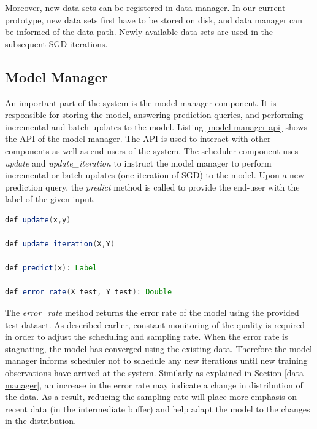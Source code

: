 Moreover,  new data sets can be registered in data manager.
In our current prototype, new data sets first have to be stored on disk, and data manager can be informed of the data path.
Newly available data sets are used in the subsequent SGD iterations.

\subsection{Model Manager} \label{model-manager} 
An important part of the system is the model manager component.
It is responsible for storing the model, answering prediction queries, and performing incremental and batch updates to the model.
Listing \ref{model-manager-api} shows the API of the model manager.
The API is used to interact with other components as well as end-users of the system.
The scheduler component uses \textit{update} and \textit{update\_iteration} to instruct the model manager to perform incremental or batch updates (one iteration of SGD) to the model.
Upon a new prediction query, the \textit{predict} method is called to provide the end-user with the label of the given input.

\noindent\begin{minipage}[t]{\linewidth}
\begin{lstlisting}[language=java, basicstyle=\small\ttfamily, frame=tb ,columns=fullflexible,
showstringspaces=false,label=model-manager-api,caption=Model Manager API, numberstyle=\tiny]
def update(x,y)

def update_iteration(X,Y)

def predict(x): Label

def error_rate(X_test, Y_test): Double

\end{lstlisting}
\end{minipage}


The \textit{error\_rate} method returns the error rate of the model using the provided test dataset.
As described earlier, constant monitoring of the quality is required in order to adjust the scheduling and sampling rate.
When the error rate is stagnating, the model has converged using the existing data.
Therefore the model manager informs scheduler not to schedule any new iterations until new training observations have arrived at the system.
Similarly as explained in Section \ref{data-manager}, an increase in the error rate may indicate a change in distribution of the data.
As a result, reducing the sampling rate will place more emphasis on recent data (in the intermediate buffer) and help adapt the model to the changes in the distribution.

